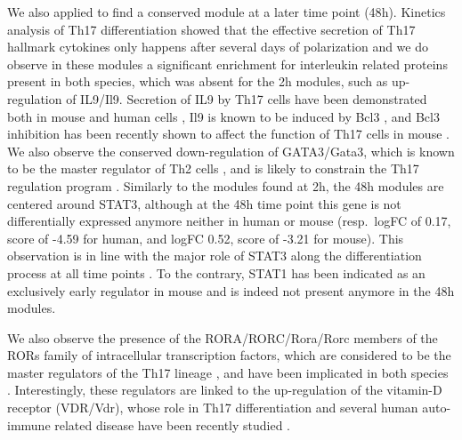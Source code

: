 We also applied \xheinz{} to find a conserved module at a later time point (\unit{48}{h}).
Kinetics analysis of Th17 differentiation showed that the effective secretion of Th17 hallmark cytokines only happens after several days of polarization \parencites{tuomela2012identification,yosef2013dynamic} and we do observe in these modules a significant enrichment for interleukin related proteins present in both species, which was absent for the \unit{2}{h} modules, such as up-regulation of IL9/Il9.
Secretion of IL9 by Th17 cells have been demonstrated both in mouse and human cells \parencite{beriou2010tgf}, Il9 is known to be induced by Bcl3 \parencite{richard1999interleukin}, and Bcl3 inhibition has been recently shown to affect the function of Th17 cells in mouse \parencite{ruan2010roles}.
We also observe the conserved down-regulation of GATA3/Gata3, which is known to be the master regulator of Th2 cells \parencite{zheng1997transcription}, and is likely to constrain the Th17 regulation program \parencite{van2008enforced}.
Similarly to the modules found at \unit{2}{h}, the \unit{48}{h} modules are centered around STAT3, although at the \unit{48}{h} time point this gene is not differentially expressed anymore neither in human or mouse (resp.\ logFC of 0.17, score of -4.59 for human, and logFC 0.52, score of -3.21 for mouse).
This observation is in line with the major role of STAT3 along the differentiation process at all time points \parencite{yosef2013dynamic}.
To the contrary, STAT1 has been indicated as an exclusively early regulator \parencite{yosef2013dynamic} in mouse and is indeed not present anymore in the \unit{48}{h} modules.%

We also observe the presence of the RORA/RORC/Rora/Rorc members of the RORs family of intracellular transcription factors, which are considered to be the master regulators of the Th17 lineage \parencite{yang2008t}, and have been implicated in both species \parencite{crome2009role}.
Interestingly, these regulators are linked to the up-regulation of the vitamin-D receptor (VDR/Vdr), whose role in Th17 differentiation and several human auto-immune related disease have been recently studied \parencite{chang2010vitamin}.

